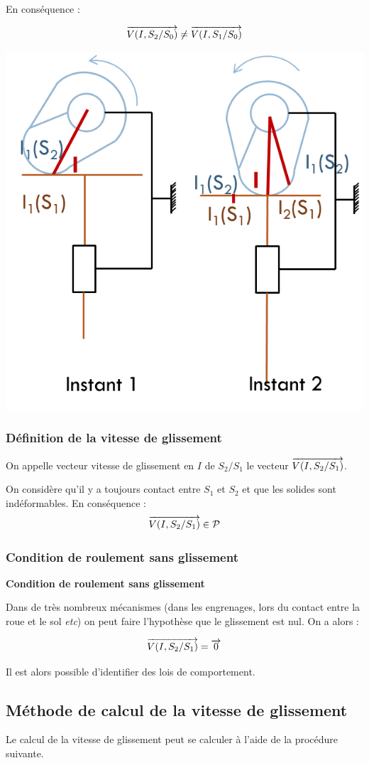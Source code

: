 \documentclass[11pt,oneside]{article}
\begin{document}
En conséquence :
\begin{resultat}
$$
\overrightarrow{V(I,S_2/S_0)} \neq \overrightarrow{V(I,S_1/S_0)}
$$ 
\end{resultat}

\begin{exemple}
\begin{center}
\includegraphics[width=.4\textwidth]{png/ptI}
\end{center}
\end{exemple}

\subsubsection{Définition de la vitesse de glissement}
On appelle vecteur vitesse de glissement en $I$ de $S_2/S_1$ le vecteur $\overrightarrow{V(I,S_2/S_1)}$.

\begin{rem}
On considère qu'il y a toujours contact entre $S_1$ et $S_2$ et que les solides sont indéformables. En conséquence :
$$\overrightarrow{V(I,S_2/S_1)} \in \mathcal{P}$$
\end{rem}

\subsubsection{Condition de roulement sans glissement}
\begin{defi}
\textbf{Condition de roulement sans glissement}

Dans de très nombreux mécanismes (dans les engrenages, lors du contact entre la roue et le sol \textit{etc}) on peut faire l'hypothèse que le glissement est nul. On a alors : 

$$
\overrightarrow{V(I,S_2/S_1)} = \overrightarrow{0}
$$
\end{defi}


Il est alors possible d'identifier des lois de comportement.
\subsection{Méthode de calcul de la vitesse de glissement}
Le calcul de la vitesse de glissement peut se calculer à l'aide de la procédure suivante.
\end{document}

